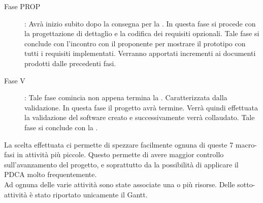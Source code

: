 \begin{description}
			\item[Fase PROP]: Avrà inizio subito dopo la consegna per la . In questa fase si procede con la progettazione di dettaglio e la codifica dei requisiti opzionali. Tale fase si conclude con l'incontro con il proponente per mostrare il prototipo con tutti i requisiti implementati. Verranno apportati incrementi ai documenti prodotti dalle precedenti fasi.
			\item[Fase V]: Tale fase comincia non appena termina la . Caratterizzata dalla validazione. In questa fase il progetto avrà termine. Verrà quindi effettuata la validazione del software creato e successivamente verrà collaudato. Tale fase si conclude con la .
		\end{description}
		La scelta effettuata ci permette di spezzare facilmente ognuna di queste 7 macro-fasi in attività più piccole. Questo permette di avere maggior controllo sull'avanzamento del progetto, e soprattutto da la possibilità di applicare il PDCA molto frequentemente.\\Ad ognuna delle varie attività sono state associate una o più risorse. Delle sotto-attività è stato riportato unicamente il Gantt.
